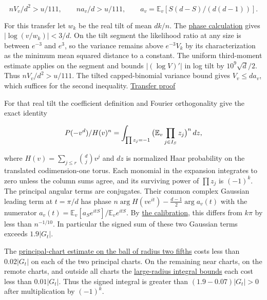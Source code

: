 \documentclass[11pt]{article}
\begin{document}
\[
nV_v/d^2>u/111,\qquad n a_v/d>u/111,\qquad
a_v=\mathbb E_v[S(d-S)/(d(d-1))].
\]

For this transfer let $w_k$ be the real tilt of mean $dk/n$. The \href{https://github.com/ProgramComputer/open-math-research/blob/main/topics/balanced-arrays/effective-sublinear/angular-phase-calibration.md}{phase calculation} gives $|\log(v/w_k)|<3/d$. On the tilt segment the likelihood ratio at any size is between $e^{-3}$ and $e^3$, so the variance remains above $e^{-3}V_k$ by its characterization as the minimum mean squared distance to a constant. The uniform third-moment estimate applies on the segment and bounds $|(\log V)'|$ in log tilt by $10^9\sqrt d/2$. Thus $nV_v/d^2>u/111$. The tilted capped-binomial variance bound gives $V_v\le d a_v$, which suffices for the second inequality. \href{https://github.com/ProgramComputer/open-math-research/blob/main/topics/balanced-arrays/effective-sublinear/angular-phase-review.md}{Transfer proof}

For that real tilt the coefficient definition and Fourier orthogonality give the exact identity

\[
P(-v^d)/H(v)^n=\int_{\prod z_j=-1}
\big(\mathbb E_v\prod_{j\in I_S} z_j\big)^n\thinspace{}dz ,
\]

where $H(v)=\sum_{j\le r}\binom dj v^j$ and $dz$ is normalized Haar probability on the translated codimension-one torus. Each monomial in the expansion integrates to zero unless the column sums agree, and its surviving power of $\prod z_j$ is $(-1)^k$. The principal angular terms are conjugates. Their common complex Gaussian leading term at $t=\pi/d$ has phase $n\arg H(ve^{it})-\frac{d-1}{2}\arg a_v(t)$ with the numerator $a_v(t)=\mathbb E_v[a_S e^{itS}]/\mathbb E_v e^{itS}$. By \href{https://github.com/ProgramComputer/open-math-research/blob/main/topics/balanced-arrays/effective-sublinear/angular-phase-calibration.md}{the calibration}, this differs from $k\pi$ by less than $n^{-1/10}$. In particular the signed sum of these two Gaussian terms exceeds $1.9|G_t|$.

The \href{https://github.com/ProgramComputer/open-math-research/blob/main/topics/balanced-arrays/effective-sublinear/angular-principal-lower.md}{principal-chart estimate on the ball of radius two fifths} costs less than $0.02|G_t|$ on each of the two principal charts. On the remaining near charts, on the remote charts, and outside all charts the \href{https://github.com/ProgramComputer/open-math-research/blob/main/topics/balanced-arrays/effective-sublinear/angular-mass-dominance.md\#larger-radius-global-version-at-the-original-row-cutoff}{large-radius integral bounds} each cost less than $0.01|G_t|$. Thus the signed integral is greater than $(1.9-0.07)|G_t|>0$ after multiplication by $(-1)^k$.
\end{document}
